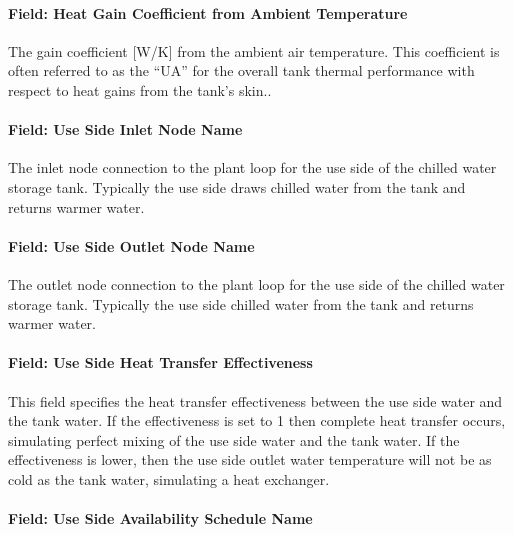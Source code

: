 \paragraph{Field: Heat Gain Coefficient from Ambient Temperature}\label{field-heat-gain-coefficient-from-ambient-temperature}

The gain coefficient {[}W/K{]} from the ambient air temperature. This coefficient is often referred to as the ``UA'' for the overall tank thermal performance with respect to heat gains from the tank's skin..

\paragraph{Field: Use Side Inlet Node Name}\label{field-use-side-inlet-node-name}

The inlet node connection to the plant loop for the use side of the chilled water storage tank. Typically the use side draws chilled water from the tank and returns warmer water.

\paragraph{Field: Use Side Outlet Node Name}\label{field-use-side-outlet-node-name}

The outlet node connection to the plant loop for the use side of the chilled water storage tank. Typically the use side chilled water from the tank and returns warmer water.

\paragraph{Field: Use Side Heat Transfer Effectiveness}\label{field-use-side-heat-transfer-effectiveness}

This field specifies the heat transfer effectiveness between the use side water and the tank water. If the effectiveness is set to 1 then complete heat transfer occurs, simulating perfect mixing of the use side water and the tank water. If the effectiveness is lower, then the use side outlet water temperature will not be as cold as the tank water, simulating a heat exchanger.

\paragraph{Field: Use Side Availability Schedule Name}\label{field-use-side-availability-schedule-name}

